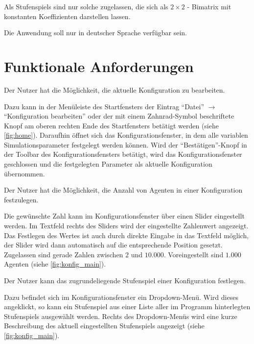 \documentclass[parskip=full,11pt]{scrartcl}
\begin{document}
Als \Glspl{Stufenspiel} sind nur solche zugelassen, die sich als \(2 \times 2\) - \Gls{Bimatrix} mit konstanten Koeffizienten darstellen lassen.

Die Anwendung soll nur in deutscher Sprache verfügbar sein.

\pagebreak

\section{Funktionale Anforderungen}

Der \Gls{Nutzer} hat die Möglichkeit, die \gls{aktuelle Konfiguration} zu bearbeiten.

Dazu kann in der Menüleiste des Startfensters der Eintrag \enquote{Datei} \(\rightarrow\) \enquote{\Gls{Konfiguration} bearbeiten} oder der mit einem Zahnrad-Symbol beschriftete Knopf am oberen rechten Ende des Startfensters betätigt werden (siehe \cref{fig:home}). Daraufhin öffnet sich das Konfigurationsfenster, in dem alle variablen Simulationsparameter festgelegt werden können. Wird der \enquote{Bestätigen}-Knopf in der Toolbar des Konfigurationsfensters betätigt, wird das Konfigurationsfenster geschlossen und die festgelegten Parameter als \gls{aktuelle Konfiguration} übernommen.

Der \Gls{Nutzer} hat die Möglichkeit, die Anzahl von Agenten in einer \Gls{Konfiguration} festzulegen.

Die gewünschte Zahl kann im Konfigurationsfenster über einen Slider eingestellt werden. Im Textfeld rechts des Sliders wird der eingestellte Zahlenwert angezeigt. Das Festlegen des Wertes ist auch durch direkte Eingabe in das Textfeld möglich, der Slider wird dann automatisch auf die entsprechende Position gesetzt. Zugelassen sind gerade Zahlen zwischen \(2\) und \(10.000\). Voreingestellt sind \(1.000\) Agenten (siehe \cref{fig:konfig_main}).

Der \Gls{Nutzer} kann das zugrundeliegende \Gls{Stufenspiel} einer \Gls{Konfiguration} festlegen.

Dazu befindet sich im Konfigurationsfenster ein Dropdown-Menü. Wird dieses angeklickt, so kann ein \Gls{Stufenspiel} aus einer Liste aller im Programm hinterlegten \Glspl{Stufenspiel} ausgewählt werden. Rechts des Dropdown-Menüs wird eine kurze Beschreibung des aktuell eingestellten \Gls{Stufenspiel}s angezeigt (siehe \cref{fig:konfig_main}).
\end{document}
